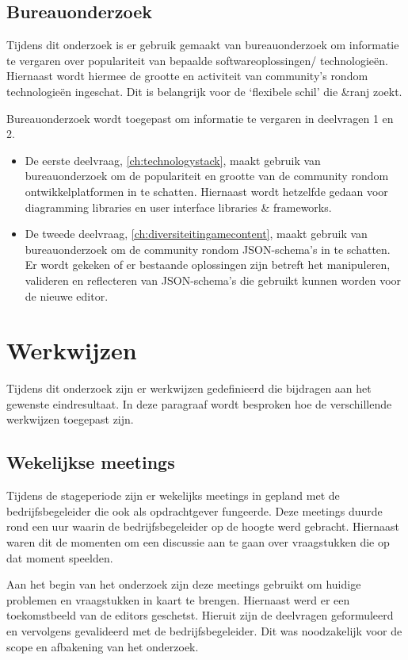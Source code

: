 \subsection{Bureauonderzoek}
Tijdens dit onderzoek is er gebruik gemaakt van bureauonderzoek om informatie te vergaren over populariteit van bepaalde softwareoplossingen/ technologieën. Hiernaast wordt hiermee de grootte en activiteit van community’s rondom technologieën ingeschat. Dit is belangrijk voor de ‘flexibele schil’ die \&ranj zoekt.

Bureauonderzoek wordt toegepast om informatie te vergaren in deelvragen 1 en 2.
\begin{itemize}
    \item De eerste deelvraag, \autoref{ch:technologystack}, maakt gebruik van bureauonderzoek om de populariteit en grootte van de community rondom ontwikkelplatformen in te schatten. Hiernaast wordt hetzelfde gedaan voor diagramming libraries en user interface libraries \& frameworks. 
    \item De tweede deelvraag, \autoref{ch:diversiteitingamecontent}, maakt gebruik van bureauonderzoek om de community rondom JSON-schema’s in te schatten. Er wordt gekeken of er bestaande oplossingen zijn betreft het manipuleren, valideren en reflecteren van JSON-schema’s die gebruikt kunnen worden voor de nieuwe editor.
\end{itemize}

\pagebreak
\section{Werkwijzen}
Tijdens dit onderzoek zijn er werkwijzen gedefinieerd die bijdragen aan het gewenste eindresultaat. In deze paragraaf wordt besproken hoe de verschillende werkwijzen toegepast zijn.

\subsection{Wekelijkse meetings}
Tijdens de stageperiode zijn er wekelijks meetings in gepland met de bedrijfsbegeleider die ook als opdrachtgever fungeerde. Deze meetings duurde rond een uur waarin de bedrijfsbegeleider op de hoogte werd gebracht. Hiernaast waren dit de momenten om een discussie aan te gaan over vraagstukken die op dat moment speelden.

Aan het begin van het onderzoek zijn deze meetings gebruikt om huidige problemen en vraagstukken in kaart te brengen. Hiernaast werd er een toekomstbeeld van de editors geschetst. Hieruit zijn de deelvragen geformuleerd en vervolgens gevalideerd met de bedrijfsbegeleider. Dit was noodzakelijk voor de scope en afbakening van het onderzoek.

